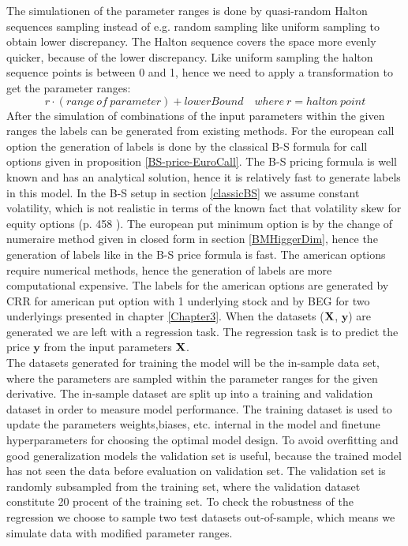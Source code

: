 The simulationen of the parameter ranges is done by quasi-random Halton sequences sampling instead of e.g. random sampling like uniform sampling to obtain lower discrepancy. The Halton sequence covers the space more evenly quicker, because of the lower discrepancy. Like uniform sampling the halton sequence points is between 0 and 1, hence we need to apply a transformation to get the parameter ranges:
$$r \cdot (range \ of \ parameter) + lowerBound \quad where \ r=halton \ point$$
After the simulation of combinations of the input parameters within the given ranges the labels can be generated from existing methods. For the european call option the generation of labels is done by the classical B-S formula for call options given in proposition \ref{BS-price-EuroCall}. The B-S pricing formula is well known and has an analytical solution, hence it is relatively fast to generate labels in this model. In the B-S setup in section \ref{classicBS} we assume constant volatility, which is not realistic in terms of the known fact that volatility skew for equity options (p. 458 \parencite{Hull}). The european put minimum option is by the change of numeraire method given in closed form in section \ref{BMHiggerDim}, hence the generation of labels like in the B-S price formula is fast. The american options require numerical methods, hence the generation of labels are more computational expensive. The labels for the american options are generated by CRR for american put option with 1 underlying stock and by BEG for two underlyings presented in chapter \ref{Chapter3}. When the datasets ($\mathbf{X}$, $\bm{y}$) are generated we are left with a regression task. The regression task is to predict the price $\bm{y}$ from the input parameters $\mathbf{X}$.\\ 

The datasets generated for training the model will be the in-sample data set, where the parameters are sampled within the parameter ranges for the given derivative. The in-sample dataset are split up into a training and validation dataset in order to measure model performance. The training dataset is used to update the parameters weights,biases, etc. internal in the model and finetune hyperparameters for choosing the optimal model design. To avoid overfitting and good generalization models the validation set is useful, because the trained model has not seen the data before evaluation on validation set. The validation set is randomly subsampled from the training set, where the validation dataset constitute 20 procent of the training set. To check the robustness of the regression we choose to sample two test datasets out-of-sample, which means we simulate data with modified parameter ranges. \\

